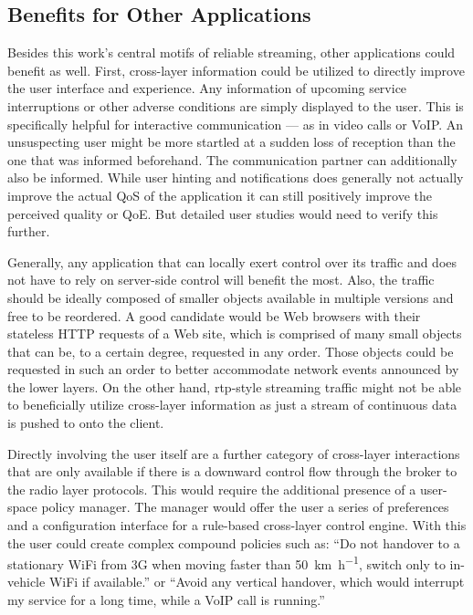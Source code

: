 \subsection{Benefits for Other Applications}

Besides this work's central motifs of reliable streaming, other applications could benefit as well. First, cross-layer information could be utilized to directly improve the user interface and experience. Any information of upcoming service interruptions or other adverse conditions are simply displayed to the user. This is specifically helpful for interactive communication --- as in video calls or \gls{VoIP}. An unsuspecting user might be more startled at a sudden loss of reception than the one that was informed beforehand. The communication partner can additionally also be informed. While user hinting and notifications does generally not actually improve the actual \gls{QoS} of the application it can still positively improve the perceived quality or \gls{QoE}. But detailed user studies would need to verify this further.

Generally, any application that can locally exert control over its traffic and does not have to rely on server-side control will benefit the most. Also, the traffic should be ideally composed of smaller objects available in multiple versions and free to be reordered. A good candidate would be Web browsers with their stateless \gls{HTTP} requests of a Web site, which is comprised of many small objects that can be, to a certain degree, requested in any order. Those objects could be requested in such an order to better accommodate network events announced by the lower layers. On the other hand, \gls{rtp}-style streaming traffic might not be able to beneficially utilize cross-layer information as just a stream of continuous data is pushed to onto the client.

Directly involving the user itself are a further category of cross-layer interactions that are only available if there is a downward control flow through the broker to the radio layer protocols. This would require the additional presence of a user-space policy manager. The manager would offer the user a series of preferences and a configuration interface for a rule-based cross-layer control engine. With this the user could create complex compound policies such as: ``Do not handover to a stationary WiFi from \gls{3G} when moving faster than \SI{50}{\kilo\meter\per\hour}, switch only to in-vehicle WiFi if available.'' or ``Avoid any vertical handover, which would interrupt my service for a long time, while a \acrshort{VoIP} call is running.''


